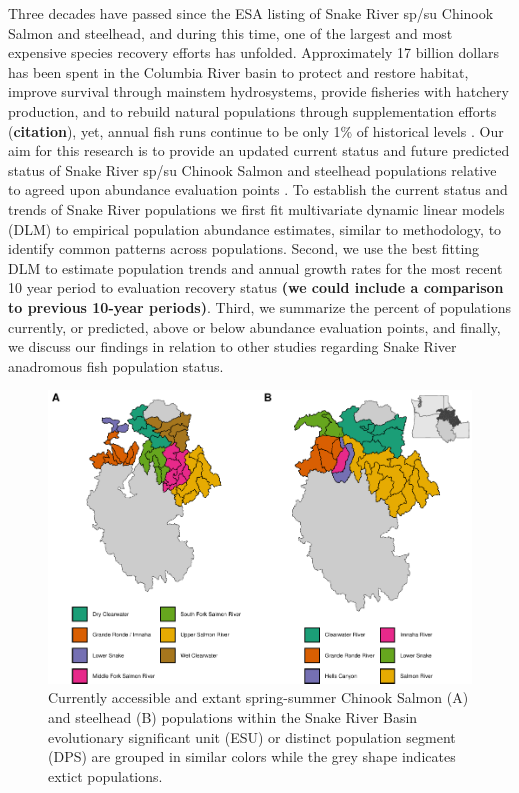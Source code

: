 \documentclass[12pt,a4paper]{article}
\begin{document}
Three decades have passed since the ESA listing of Snake River sp/su Chinook Salmon and steelhead, and during this time, one of the largest and most expensive species recovery efforts has unfolded. Approximately 17 billion dollars has been spent in the Columbia River basin to protect and restore habitat, improve survival through mainstem hydrosystems, provide fisheries with hatchery production, and to rebuild natural populations through supplementation efforts (\textbf{citation}), yet, annual fish runs continue to be only 1\% of historical levels \autocite{thurow_wild_2019,storch_review_2022,ford_biological_2022}. Our aim for this research is to provide an updated current status and future predicted status of Snake River sp/su Chinook Salmon and steelhead populations relative to agreed upon abundance evaluation points \autocite{cbp_vision_2020}. To establish the current status and trends of Snake River populations we first fit multivariate dynamic linear models (DLM) to empirical population abundance estimates, similar to \textcite{ford_biological_2022} methodology, to identify common patterns across populations. Second, we use the best fitting DLM to estimate population trends and annual growth rates for the most recent 10 year period to evaluation recovery status \textbf{(we could include a comparison to previous 10-year periods)}. Third, we summarize the percent of populations currently, or predicted, above or below abundance evaluation points, and finally, we discuss our findings in relation to other studies regarding Snake River anadromous fish population status.

\begin{figure}
\centering
\includegraphics{manuscript_SRAFS_files/figure-latex/esu-map-1.pdf}
\caption{\label{fig:esu-map}Currently accessible and extant spring-summer Chinook Salmon (A) and steelhead (B) populations within the Snake River Basin evolutionary significant unit (ESU) or distinct population segment (DPS) are grouped in similar colors while the grey shape indicates extict populations.}
\end{figure}
\end{document}
